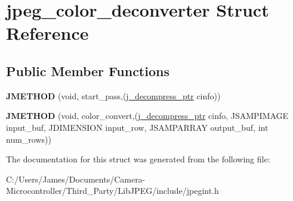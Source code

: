 \hypertarget{structjpeg__color__deconverter}{}\section{jpeg\+\_\+color\+\_\+deconverter Struct Reference}
\label{structjpeg__color__deconverter}
\subsection*{Public Member Functions}
\begin{DoxyCompactItemize}
\item 
\mbox{\label{structjpeg__color__deconverter_a49e08839ba93659b8c4dae80ec9f4252}} 
{\bfseries J\+M\+E\+T\+H\+OD} (void, start\+\_\+pass,(\hyperlink{structjpeg__decompress__struct}{j\+\_\+decompress\+\_\+ptr} cinfo))
\item 
\mbox{\label{structjpeg__color__deconverter_af74d55b92772b85d12f71bad4f5bce16}} 
{\bfseries J\+M\+E\+T\+H\+OD} (void, color\+\_\+convert,(\hyperlink{structjpeg__decompress__struct}{j\+\_\+decompress\+\_\+ptr} cinfo, J\+S\+A\+M\+P\+I\+M\+A\+GE input\+\_\+buf, J\+D\+I\+M\+E\+N\+S\+I\+ON input\+\_\+row, J\+S\+A\+M\+P\+A\+R\+R\+AY output\+\_\+buf, int num\+\_\+rows))
\end{DoxyCompactItemize}


The documentation for this struct was generated from the following file\+:\begin{DoxyCompactItemize}
\item 
C\+:/\+Users/\+James/\+Documents/\+Camera-\/\+Microcontroller/\+Third\+\_\+\+Party/\+Lib\+J\+P\+E\+G/include/jpegint.\+h\end{DoxyCompactItemize}
